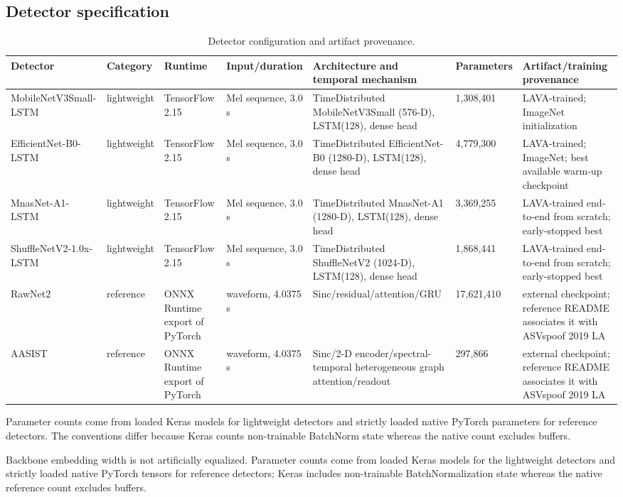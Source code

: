 \documentclass[10pt,journal,onecolumn]{IEEEtran}
\begin{document}
\subsection{Detector specification}
\begin{table}[htbp]
\centering
\tiny
\caption{Detector configuration and artifact provenance.}
\label{tab:4}
\begin{tabularx}{\textwidth}{YYYYYYY}
\toprule
Detector & Category & Runtime & Input/duration & Architecture and temporal mechanism & Parameters & Artifact/training provenance \\
\midrule
MobileNetV3Small-LSTM & lightweight & TensorFlow 2.15 & Mel sequence, 3.0 s & TimeDistributed MobileNetV3Small (576-D), LSTM(128), dense head & 1,308,401 & LAVA-trained; ImageNet initialization \\
EfficientNet-B0-LSTM & lightweight & TensorFlow 2.15 & Mel sequence, 3.0 s & TimeDistributed EfficientNet-B0 (1280-D), LSTM(128), dense head & 4,779,300 & LAVA-trained; ImageNet; best available warm-up checkpoint \\
MnasNet-A1-LSTM & lightweight & TensorFlow 2.15 & Mel sequence, 3.0 s & TimeDistributed MnasNet-A1 (1280-D), LSTM(128), dense head & 3,369,255 & LAVA-trained end-to-end from scratch; early-stopped best \\
ShuffleNetV2-1.0x-LSTM & lightweight & TensorFlow 2.15 & Mel sequence, 3.0 s & TimeDistributed ShuffleNetV2 (1024-D), LSTM(128), dense head & 1,868,441 & LAVA-trained end-to-end from scratch; early-stopped best \\
RawNet2 & reference & ONNX Runtime export of PyTorch & waveform, 4.0375 s & Sinc/residual/attention/GRU & 17,621,410 & external checkpoint; reference README associates it with ASVspoof 2019 LA \\
AASIST & reference & ONNX Runtime export of PyTorch & waveform, 4.0375 s & Sinc/2-D encoder/spectral-temporal heterogeneous graph attention/readout & 297,866 & external checkpoint; reference README associates it with ASVspoof 2019 LA \\
\bottomrule
\end{tabularx}
\end{table}
Parameter counts come from loaded Keras models for lightweight detectors and strictly loaded native PyTorch parameters for reference detectors. The conventions differ because Keras counts non-trainable BatchNorm state whereas the native count excludes buffers.

Backbone embedding width is not artificially equalized. Parameter counts come from loaded Keras models for the lightweight detectors and strictly loaded native PyTorch tensors for reference detectors; Keras includes non-trainable BatchNormalization state whereas the native reference count excludes buffers.
\end{document}

